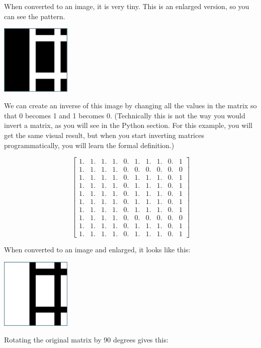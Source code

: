 When converted to an image, it is very tiny. This is an enlarged version, so you can see the pattern.

\includegraphics[width=0.25\textwidth]{normal.png}

We can create an inverse of this image by changing all the values in the matrix so that 0 becomes 1 and 1 becomes 0. (Technically this is not the way you would invert a matrix, as you will see in the Python section. For this example, you will get the same visual result, but when you start inverting matrices programmatically, you will learn the formal definition.)

$$\begin{bmatrix}
1. & 1. & 1. & 1. & 0. & 1. & 1. & 1. & 0. & 1\\
1. & 1. & 1. & 1. & 0. & 0. & 0. & 0. & 0. & 0\\
1. & 1. & 1. & 1. & 0. & 1. & 1. & 1. & 0. & 1\\
1. & 1. & 1. & 1. & 0. & 1. & 1. & 1. & 0. & 1\\
1. & 1. & 1. & 1. & 0. & 1. & 1. & 1. & 0. & 1\\
1. & 1. & 1. & 1. & 0. & 1. & 1. & 1. & 0. & 1\\
1. & 1. & 1. & 1. & 0. & 1. & 1. & 1. & 0. & 1\\
1. & 1. & 1. & 1. & 0. & 0. & 0. & 0. & 0. & 0\\
1. & 1. & 1. & 1. & 0. & 1. & 1. & 1. & 0. & 1\\
1. & 1. & 1. & 1. & 0. & 1. & 1. & 1. & 0. & 1
\end{bmatrix}$$

When converted to an image and enlarged, it looks like this:

\includegraphics[width=0.25\textwidth]{inverse.png}

Rotating the original matrix by 90 degrees gives this:

